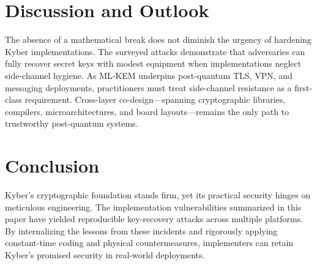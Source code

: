 \documentclass[11pt,a4paper]{article}
\begin{document}
\section{Discussion and Outlook}
The absence of a mathematical break does not diminish the urgency of hardening Kyber implementations.
The surveyed attacks demonstrate that adversaries can fully recover secret keys with modest equipment when implementations neglect side-channel hygiene.
As ML-KEM underpins post-quantum TLS, VPN, and messaging deployments, practitioners must treat side-channel resistance as a first-class requirement.
Cross-layer co-design---spanning cryptographic libraries, compilers, microarchitectures, and board layouts---remains the only path to trustworthy post-quantum systems.

\section{Conclusion}
Kyber's cryptographic foundation stands firm, yet its practical security hinges on meticulous engineering.
The implementation vulnerabilities summarized in this paper have yielded reproducible key-recovery attacks across multiple platforms.
By internalizing the lessons from these incidents and rigorously applying constant-time coding and physical countermeasures, implementers can retain Kyber's promised security in real-world deployments.
\end{document}
